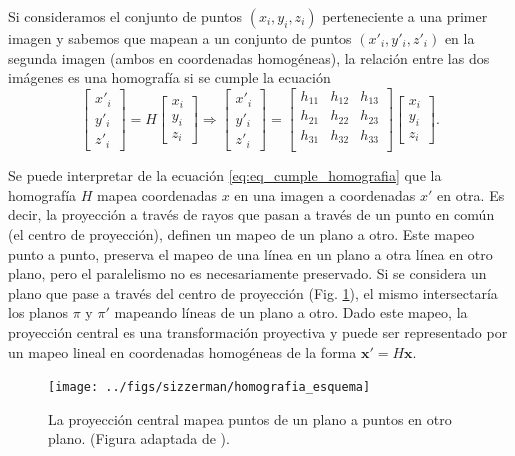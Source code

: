 Si consideramos el conjunto de puntos $(x_i,y_i,z_i)$ perteneciente a una primer imagen y sabemos que mapean a un conjunto de puntos $(x'_i, y'_i, z'_i)$ en la segunda imagen (ambos en coordenadas homogéneas), la relación entre las dos imágenes es una homografía si se cumple la ecuación %
\begin{equation}
  \begin{bmatrix}
  x'_i\\
  y'_i\\
  z'_i
  \end{bmatrix}=\textit{H}
  \begin{bmatrix}
  x_i\\
  y_i \\
  z_i
  \end{bmatrix}\Longrightarrow
\begin{bmatrix}
  x'_i\\
  y'_i\\
  z'_i
  \end{bmatrix}=
  \begin{bmatrix}
  h_{11} & h_{12} & h_{13}\\
  h_{21} & h_{22} & h_{23}\\
  h_{31} & h_{32} & h_{33}\\
  \end{bmatrix}
\begin{bmatrix}
  x_i\\
  y_i \\
  z_i
  \end{bmatrix}.
  \label{eq:eq_cumple_homografia}
\end{equation}

Se puede interpretar de la ecuación \eqref{eq:eq_cumple_homografia} que la homografía $\textit{H}$ mapea coordenadas $x$ en una imagen a coordenadas $x'$ en otra. Es decir, la proyección a través de rayos que pasan a través de un punto en común (el centro de proyección), definen un mapeo de un plano a otro. Este mapeo punto a punto, preserva el mapeo de una línea en un plano a otra línea en otro plano, pero el paralelismo no es necesariamente preservado. Si se considera un plano que pase a través del centro de proyección (Fig. \ref{fig:homografia_esquema}), el mismo intersectaría los planos $\pi$ y $\pi'$ mapeando líneas de un plano a otro. Dado este mapeo, la proyección central es una transformación proyectiva y puede ser representado por un mapeo lineal en coordenadas homogéneas de la forma $\mathbf{x'}=\textit{H}\mathbf{x}$.
\begin{figure}[tbhp]
  \centerline{\texttt{[image: ../figs/sizzerman/homografia\_esquema]}}
  \caption[Mapeo de puntos de un plano a otro]{La proyección central mapea puntos de un plano a puntos en otro plano. (Figura adaptada de \cite{Hartley2004}).}
  \label{fig:homografia_esquema}
\end{figure}

